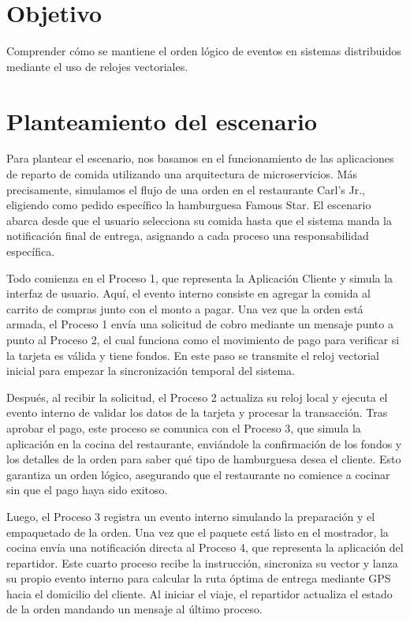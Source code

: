 \documentclass[letterpaper,11pt]{article}
\begin{document}


\newpage
{\hypersetup{linkcolor=black}\tableofcontents}

\newpage

\setcounter{page}{1}

\section{Objetivo}
Comprender cómo se mantiene el orden lógico de eventos en sistemas distribuidos mediante el uso de relojes vectoriales.

\section{Planteamiento del escenario}
Para plantear el escenario, nos basamos en el funcionamiento de las aplicaciones de reparto de comida utilizando una arquitectura de microservicios. Más precisamente, simulamos el flujo de una orden en el restaurante Carl's Jr., eligiendo como pedido específico la hamburguesa Famous Star. El escenario abarca desde que el usuario selecciona su comida hasta que el sistema manda la notificación final de entrega, asignando a cada proceso una responsabilidad específica.

Todo comienza en el Proceso 1, que representa la Aplicación Cliente y simula la interfaz de usuario. Aquí, el evento interno consiste en agregar la comida al carrito de compras junto con el monto a pagar. Una vez que la orden está armada, el Proceso 1 envía una solicitud de cobro mediante un mensaje punto a punto al Proceso 2, el cual funciona como el movimiento de pago para verificar si la tarjeta es válida y tiene fondos. En este paso se transmite el reloj vectorial inicial para empezar la sincronización temporal del sistema.

Después, al recibir la solicitud, el Proceso 2 actualiza su reloj local y ejecuta el evento interno de validar los datos de la tarjeta y procesar la transacción. Tras aprobar el pago, este proceso se comunica con el Proceso 3, que simula la aplicación en la cocina del restaurante, enviándole la confirmación de los fondos y los detalles de la orden para saber qué tipo de hamburguesa desea el cliente. Esto garantiza un orden lógico, asegurando que el restaurante no comience a cocinar sin que el pago haya sido exitoso.

Luego, el Proceso 3 registra un evento interno simulando la preparación y el empaquetado de la orden. Una vez que el paquete está listo en el mostrador, la cocina envía una notificación directa al Proceso 4, que representa la aplicación del repartidor. Este cuarto proceso recibe la instrucción, sincroniza su vector y lanza su propio evento interno para calcular la ruta óptima de entrega mediante GPS hacia el domicilio del cliente. Al iniciar el viaje, el repartidor actualiza el estado de la orden mandando un mensaje al último proceso.
\end{document}
